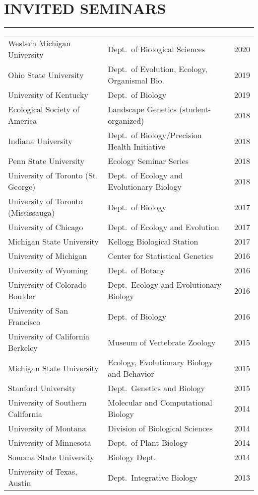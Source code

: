 \documentclass{article}
\begin{document}
\section*{INVITED SEMINARS}
\vspace{-0.6cm}
\rule{470pt}{0.4pt}
%
\begin{longtable}{>{\everypar{\hangindent1cm}}p{}p{}p{}}
%
Western Michigan University & Dept.\ of Biological Sciences & \hfill 2020 \\
%
Ohio State University & Dept.\ of Evolution, Ecology, Organismal Bio. & \hfill 2019 \\
%
University of Kentucky & Dept.\ of Biology & \hfill 2019 \\
%
Ecological Society of America & Landscape Genetics (student-organized) & \hfill 2018 \\
%
Indiana University & Dept.\ of Biology/Precision Health Initiative & \hfill 2018 \\
%
Penn State University & Ecology Seminar Series & \hfill 2018 \\
%
University of Toronto (St. George) & Dept.\ of Ecology and Evolutionary Biology & \hfill 2018 \\
%
University of Toronto (Mississauga) & Dept.\ of Biology & \hfill 2017 \\
%
University of Chicago & Dept.\ of Ecology and Evolution & \hfill 2017 \\
%
Michigan State University & Kellogg Biological Station & \hfill 2017 \\
%
University of Michigan & Center for Statistical Genetics & \hfill 2016 \\
%
University of Wyoming & Dept.\ of Botany & \hfill 2016 \\
%
University of Colorado Boulder & Dept.\ Ecology and Evolutionary Biology & \hfill 2016 \\
%
University of San Francisco & Dept.\ of Biology & \hfill 2016 \\
%
University of California Berkeley & Museum of Vertebrate Zoology & \hfill 2015 \\
%
Michigan State University & Ecology, Evolutionary Biology and Behavior & \hfill 2015 \\
%
Stanford University & Dept.\ Genetics and Biology & \hfill 2015 \\
%
University of Southern California & Molecular and Computational Biology & \hfill 2014 \\
%
University of Montana & Division of Biological Sciences & \hfill 2014 \\
%
University of Minnesota & Dept.\ of Plant Biology & \hfill 2014 \\
%
Sonoma State University & Biology Dept.\ & \hfill 2014 \\
%
University of Texas, Austin & Dept.\ Integrative Biology & \hfill 2013 \\
%
\end{longtable}
%
\end{document}
